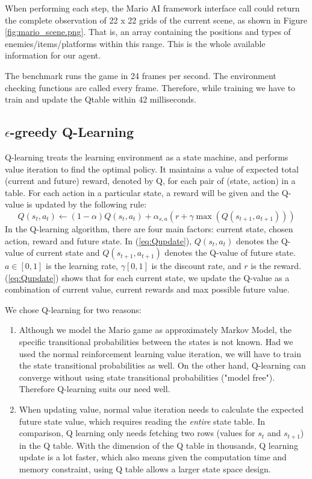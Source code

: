 When performing each step, the Mario AI framework interface call could return the complete observation of 22 x 22 grids of the current scene, as shown in Figure \ref{fig:mario_scene.png}. That is, an array containing the positions and types of enemies/items/platforms within this range. This is the whole available information for our agent.

The benchmark runs the game in 24 frames per second. The environment checking functions are called every frame. Therefore, while training we have to train and update the Qtable within 42 milliseconds.

\subsection{$\epsilon$-greedy Q-Learning}
Q-learning treats the learning environment as a state machine, and performs value iteration to find the optimal policy. It maintains a value of expected total (current and future) reward, denoted by Q, for each pair of (state, action) in a table. For each action in a particular state, a reward will be given and the Q-value is updated by the following rule:
\begin{equation}
\label{eq:Qupdate}
Q(s_t,a_t) \leftarrow (1-\alpha)Q(s_t,a_t) + \alpha_{s, a}(r+\gamma\max(Q(s_{t+1},a_{t+1})))
\end{equation}
In the Q-learning algorithm, there are four main factors: current state, chosen action, reward and future state. In (\ref{eq:Qupdate}), $Q(s_t,a_t)$ denotes the Q-value of current state and $Q(s_{t+1},a_{t+1})$ denotes the Q-value of future state. $a \in \left[0,1\right]$ is the learning rate, $\gamma \left[0,1\right]$ is the discount rate, and $r$ is the reward. (\ref{eq:Qupdate}) shows that for each current state, we update the Q-value as a combination of current value, current rewards and max possible future value.

We chose Q-learning for two reasons: 
\begin{enumerate}
\item
Although we model the Mario game as approximately Markov Model, the specific transitional probabilities between the states is not known. Had we used the normal reinforcement learning value iteration, we will have to train the state transitional probabilities as well. On the other hand, Q-learning can converge without using state transitional probabilities ("model free"). Therefore Q-learning suits our need well.
\item
When updating value, normal value iteration needs to calculate the expected future state value, which requires reading the \textit{entire} state table. In comparison, Q learning only needs fetching two rows (values for $s_t$ and $s_{t+1}$) in the Q table. With the dimension of the Q table in thousands, Q learning update is a lot faster, which also means given the computation time and memory constraint, using Q table allows a larger state space design.
\end{enumerate}

